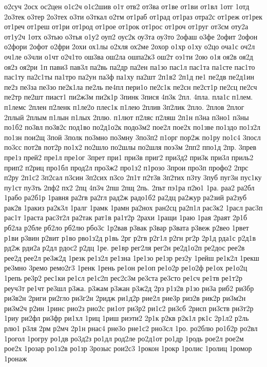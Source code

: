 {о2суч
2осх
ос2цен
о1с2ч
о1с2шив
о1т
отв2
от3ва
от1ве
от1ви
от1вл
1отг
1отд
2о3тек
о3тер
2о3тех
о3ти
о3ткал
о2тм
от1раб
от1рад
от1раз
отра2с
от1реж
от1рек
от1реч
от1реш
от1ри
от1род
от1рое
от1рок
от1рос
от1роч
от1руг
от3см
оту2а
от1у2ч
1отх
о3тью
о3тья
о1у2
оуп2
оус2к
оу3та
оу3то
2офаш
о3фе
2офит
2офон
о2фори
2офот
о2фри
2охи
ох1лы
о2хля
ох2ме
2охор
о1хр
о1ху
о2цо
оча1с
оч2л
оч1ле
о3чли
о1чт
о2ч1то
ош3ва
ош2ла
ошпа2к3
ош2т
оэ1ти
2ою
о1я
оя2в
оя2д
оя2з
оя2ри
1п
пави3
пав3л
па2вь
па2др
па2ен
па1зо
пас1л
пас1та
па1сте
пас1то
пас1ту
па2с1ты
па1тро
па2ун
па3ф
па1ху
па2шт
2п1в2
2п1д
пе1
пе2дв
пе2д1ин
пе2з
пе3за
пе3зо
пе2к1ла
пе2ль
пе4пл
пери1о
пе2с1к
пе2сн
пе2ст1р
пе2сц
пе2сч
пе2тр
пе2шт
пиаст1
пи2ж3м
пи2к1р
3пинк
3пися
4п3к
2пл.
4пла.
пла1с
п1лем.
п1лемс
2плен
п2ленк
п1ле2о
плес1к
п1лею
2плив
3п2лик
2пло.
2плов
2плог
2плый
2плым
п1лын
п1лых
2плю.
п1лют
п2ляс
п2ляш
2п1н
п3на
п3но1
п3ны
по1б2
по3вл
по3в2с
под1во
по2д1о2к
подо3м2
пое2л
пое2х
по1зве
по1здо
по1з2л
по1зн
пои2щ
3пой
3полк
по3мно
по3мну
3по3п2
п1орг
пор2ж
по1ру
по1с4
3посл
по3сс
пот2в
пот2р
по1х2
по2шло
по2шлы
по2шля
поэ3м
2пп2
ппо1д
2пр.
3прев
пре1з
прей2
пре1л
пре1ог
3прет
при1
при3в
приг2
при3д2
при3к
при3л
приль2
прип2
п2риц
про1бл
прод2л
про3ж2
про1з2
п1розо
3прои
про3п
профо2
2прс
п2ру
2п1с2
3п2сал
п3син
3п2сих
п3со
2п1т
п2т3в
3п2тих
п3ту
3пуб
пуг3н
пус1ку
пу1ст
пу3ть
2пф2
пх2
2пц
4п3ч
2пш
2пщ
2пь.
2пьт
пэ1ра
п2ю1
1ра.
раа2
ра2бл
1рабо
ра2б1р
1равня
ра2гв
ра2гл
рад2ж
радо1б2
ра2дц
ра2жур
ра2зий
ра2зуб
рак2в
1ракиз
ра2к3л
1ралг
1рамк
1рамн
ра2нох
ран2сц
ра2п1л
рас3к2
1расл
рас3п
рас1т
1раста
рас3т2л
ра2так
рат1в
ра1т2р
2рахи
1ращи
1раю
1рая
2раят
2р1б
рб2ла
р2бле
рб2ло
рб2лю
рбо3с
1р2вав
р3вак
р3вар
р3вата
р3веж
р2вео
1рвет
р1ви
р3вин
р2вит
р1во
рво1з2д
р1вь
2рг
р2гв
р2г1л
р2гн
рг2р
2р1д
рда1с
р2д1в
рд2ж
рди2а
р2дл
рдос2
р2дц
1ре.
ре1вр
рег2ля
рег2н
ре2д1о2п
ре2дос
рее2в
рее2д
рее2л
ре3ж2д
1резк
ре1з2л
ре1зна
1ре1зо
ре1зр
рез2у
1рейш
ре1к2л
1рекш
ре3мно
3ремо
ремо2г3
1ренк
1рень
ре1он
ре1оп
ре1о2р
ре1о2ф
ре1ох
ре1о2ц
1репь
ре3р2
рес1ки
ре1сл
ре1с2п
рес2с3м
ре3ста
ре3сто
ре1сч
ре1тв
ре1т2р
реуч3т
ре1чт
ре3шл
р3жа.
р3жам
р3жан
р3ж2д
2рз
р1з2в
р1зо
ри3а
риб2
ри3бр
ри3в2н
2риги
ри2гло
ри3г2н
2ридж
ри1д2р
рие2л
рие3р
риз2в
рик2р
ри3м2н
ри3м2ч
р2ин
1ринс
рио2з
рио2с
ри1от
ри3р2
ри1с2
ри3сб
2рисп
ри3ств
ри3т2р
1риу
ри2фл
ри3фр
ри1хл
1риц
1риш
риэти2
2р1к
р2кв
р2к1л
рк1с
2р1л2
р2ль
рлю1
р3ля
2рм
р2мч
2р1н
рнас4
рне3о
рне1с2
рно3сл
1ро.
ро2блю
ро1б2р
ро2вл
1рогол
1рогру
ро1дв
ро3д2з
ро1дл
род2ле
ро2д1от
ро1др
1родь
рое2л
рое2м
рое2х
1розар
ро1з2в
ро1зр
3розыс
рои2с3
1рокон
1рокр
1ролис
1ролиц
1ромор
1ронаж
}
